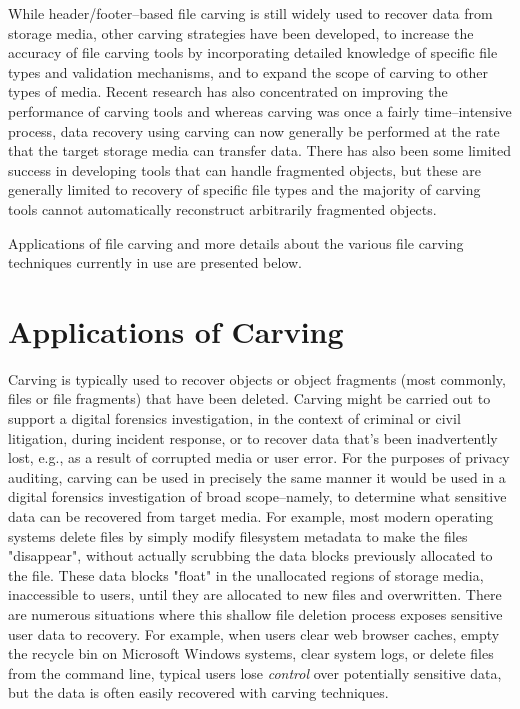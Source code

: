 While header/footer--based file carving is still widely used to recover data from storage media, other carving strategies have been developed, to increase the accuracy of file carving tools by incorporating detailed knowledge of specific file types and validation mechanisms, and to expand the scope of carving to other types of media.  Recent research has also concentrated on improving the performance of carving tools and whereas carving was once a fairly time--intensive process, data recovery using carving can now generally be performed at the rate that the target storage media can transfer data.  There has also been some limited success in developing tools that can handle fragmented objects, but these are generally limited to recovery of specific file types and the majority of carving tools cannot automatically reconstruct arbitrarily fragmented objects.   

Applications of file carving and more details about the various file carving techniques currently in use are presented below.

\section{Applications of Carving}

Carving is typically used to recover objects or object fragments (most commonly, files or file fragments) that have been deleted.  Carving might be carried out to support a digital forensics investigation, in the context of criminal or civil litigation, during incident response, or to recover data that's been inadvertently lost, e.g., as a result of  corrupted media or user error.  For the purposes of privacy auditing, carving can be used in precisely the same manner it would be used in a digital forensics investigation of broad scope--namely, to determine what sensitive data can be recovered from target media.  For example, most modern operating systems delete files by simply modify filesystem metadata to make the files "disappear", without actually scrubbing the data blocks previously allocated to the file.  These data blocks "float" in the unallocated regions of storage media, inaccessible to users, until they are allocated to new files and overwritten.  There are numerous situations where this shallow file deletion process exposes sensitive user data to recovery.  For example, when users clear web browser caches, empty the recycle bin on Microsoft Windows systems, clear system logs, or delete files from the command line, typical users lose \emph{control} over potentially sensitive data, but the data is often easily recovered with carving techniques.  

